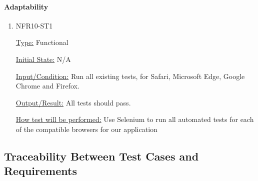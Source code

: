 \documentclass[12pt, titlepage]{article}
\begin{document}
\paragraph{Adaptability}

\begin{enumerate}

\item{NFR10-ST1\\}

\underline{Type:} Functional

\underline{Initial State:} N/A

\underline{Input/Condition:} Run all existing tests, for Safari, Microsoft Edge, Google Chrome and Firefox. 

\underline{Output/Result:} All tests should pass.

\underline{How test will be performed:} 
Use Selenium to run all automated tests for each of the compatible browsers for our application

\end{enumerate}

\subsection{Traceability Between Test Cases and Requirements}
\end{document}
